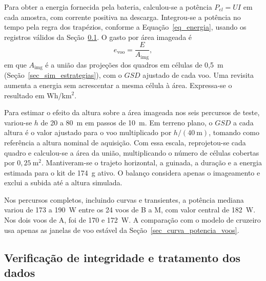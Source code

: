 Para obter a energia fornecida pela bateria, calculou-se a potência $P_{el}=UI$ em cada amostra, com corrente positiva na descarga. Integrou-se a potência no tempo pela regra dos trapézios, conforme a Equação~\eqref{eq_energia}, usando os registros válidos da Seção~\ref{sec_base_integridade}. O gasto por área imageada é
\begin{equation}
  e_{\mathrm{voo}} = \frac{E}{A_{\mathrm{img}}},
  \label{eq_e_voo}
\end{equation}
em que $A_{\mathrm{img}}$ é a união das projeções dos quadros em células de 0,5~m (Seção~\ref{sec_sim_estrategias}), com o $GSD$ ajustado de cada voo. Uma revisita aumenta a energia sem acrescentar a mesma célula à área. Expressa-se o resultado em Wh/km$^2$.

Para estimar o efeito da altura sobre a área imageada nos seis percursos de teste, variou-se $h$ de 20 a 80~m em passos de 10~m. Em terreno plano, o $GSD$ a cada altura é o valor ajustado para o voo multiplicado por $h/(40~\mathrm{m})$, tomando como referência a altura nominal de aquisição. Com essa escala, reprojetou-se cada quadro e calculou-se a área da união, multiplicando o número de células cobertas por $0,25~\mathrm{m}^2$. Mantiveram-se o trajeto horizontal, a guinada, a duração e a energia estimada para o kit de 174~g ativo. O balanço considera apenas o imageamento e exclui a subida até a altura simulada.

Nos percursos completos, incluindo curvas e transientes, a potência mediana variou de 173 a 190~W entre os 24 voos de B a M, com valor central de 182~W. Nos dois voos de A, foi de 170 e 172~W. A comparação com o modelo de cruzeiro usa apenas as janelas de voo estável da Seção~\ref{sec_curva_potencia_voos}.

\subsection{Verificação de integridade e tratamento dos dados}
\label{sec_base_integridade}

